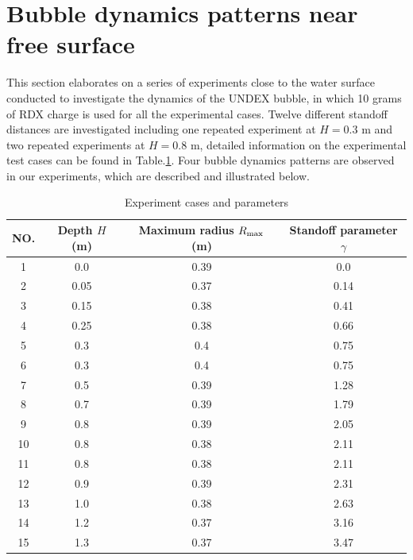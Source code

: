 \documentclass[%
 aip,
 amsmath,amssymb,
 reprint,%
]{revtex4-1}
\begin{document}
{\section{Bubble dynamics patterns near free surface}
\label{s:results}
This section elaborates on a series of experiments close to the water surface conducted to investigate the dynamics of the UNDEX bubble, in which 10 grams of RDX charge is used for all the experimental cases. Twelve different standoff distances are investigated including one repeated experiment at $H=0.3$ m and two repeated experiments at $H=0.8$ m, detailed information on the experimental test cases can be found in Table.\ref{table:experiment case}. Four bubble dynamics patterns are observed in our experiments, which are described and illustrated below.
\begin{table}
	\centering
	\caption{Experiment cases and parameters}
	\begin{ruledtabular}
	\begin{tabular}{cccc}	
		NO.&Depth $H$  (m) &Maximum radius $R_{\rm{max}}$  (m) &Standoff parameter $\gamma$\\
		\hline
		1& 0.0&0.39&0.0\\
		2& 0.05&0.37&0.14\\
		3& 0.15&0.38&0.41\\
		4& 0.25&0.38&0.66\\
		5& 0.3&0.4&0.75\\
		6& 0.3&0.4&0.75\\
		7&0.5&0.39& 1.28\\
		8& 0.7&0.39&1.79\\
		9&0.8&0.39& 2.05\\
		10&0.8&0.38& 2.11\\
		11&0.8&0.38& 2.11\\
		12&0.9&0.39& 2.31\\
		13&1.0&0.38& 2.63\\
		14&1.2&0.37& 3.16\\
		15&1.3&0.37&3.47\\
	\end{tabular}
	\end{ruledtabular}
	\label{table:experiment case}
\end{table}

}
\end{document}
